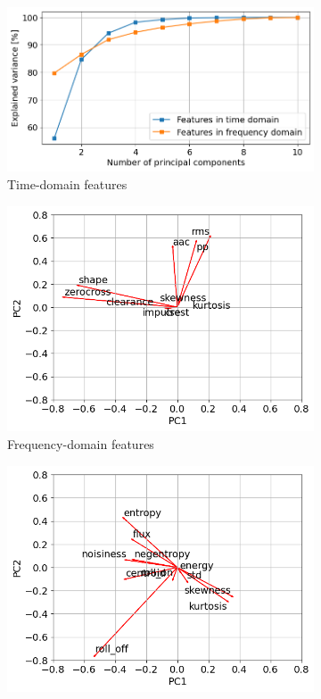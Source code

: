 \begin{figure}[h]
    \centering
    \begin{subfigure}[b]{\textwidth}
        \includegraphics[width=\textwidth]{assets/results/eda/PCA-explained-variance.png}
        \caption{Time-domain features}
    \end{subfigure}
    \hfill
    \begin{subfigure}[b]{0.48\textwidth}
        \includegraphics[width=\textwidth]{assets/results/eda/PCA-TD-loading-plot.png}
        \caption{Frequency-domain features}
    \end{subfigure}
    \hfill
    \begin{subfigure}[b]{0.48\textwidth}
        \includegraphics[width=\textwidth]{assets/results/eda/PCA-FD-loading-plot.png}

\end{subfigure}
\end{figure}
